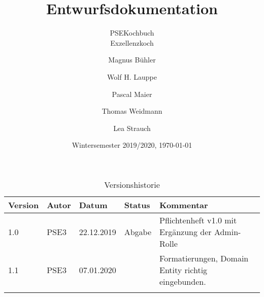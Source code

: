 \documentclass[a4paper,,openany,parskip=full]{scrreprt}
\begin{document}
\title{
	\huge{Entwurfsdokumentation}
	}
\subtitle{
	\vspace{1cm}
	  \Large {PSEKochbuch}\\
		\LARGE{Exzellenzkoch}
	\vspace{2cm}
	}
\date{
	\vspace{3cm}
	Wintersemester 2019/2020, \today \\
	\vspace{1cm}
	\vspace{1cm}
	}
\author{
		Magnus Bühler
		\and Wolf H. Lauppe
		\and Pascal Maier
		\and Thomas Weidmann
		\and Lea Strauch
		}
\maketitle


\newpage
\begin{table}[b]
\centering
\begin{tabular}{|l|l|l|l|p{}|}\hline
	\textbf{Version}	&\textbf{Autor}	&\textbf{Datum}	&\textbf{Status}	&\textbf{Kommentar}
\\\hline	1.0		&PSE3		&22.12.2019		&Abgabe				&Pflichtenheft v1.0 mit Ergänzung der Admin-Rolle
\\\hline	1.1		&PSE3		&07.01.2020		&				&Formatierungen, Domain Entity richtig eingebunden. 
\\\hline				&			&			&			&
\\\hline
\end{tabular}
\caption{\label{tab:revision}Versionshistorie}
\end{table}


\newpage
{}
\tableofcontents
\newpage
{}


















\printnoidxglossaries
\end{document}
